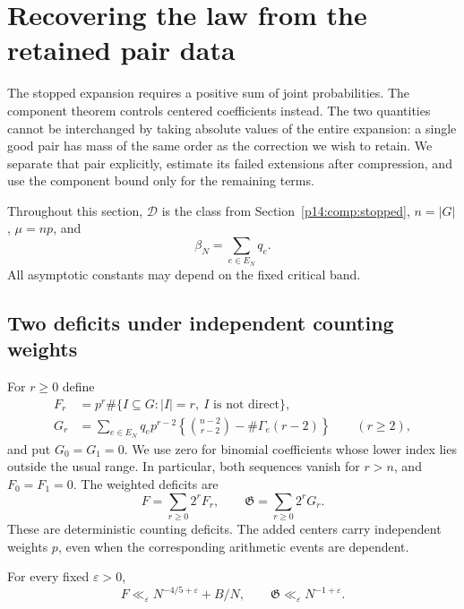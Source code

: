\section{Recovering the law from the retained pair data}
\label{p1:close:section}

The stopped expansion requires a positive sum of joint
probabilities.  The component theorem controls centered
coefficients instead.  The two quantities cannot be interchanged
by taking absolute values of the entire expansion: a single good
pair has mass of the same order as the correction we wish to
retain.  We separate that pair explicitly, estimate its failed
extensions after compression, and use the component bound only
for the remaining terms.

Throughout this section, $\mathscr D$ is the class from
Section~\ref{p14:comp:stopped}, $n=|G|$, $\mu=np$, and
\[
 \beta_N=\sum_{e\in E_N}q_e.
\]
All asymptotic constants may depend on the fixed critical band.

\subsection{Two deficits under independent counting weights}

For $r\ge0$ define
\begin{align}
 F_r&=p^r\#\{I\subseteq G:|I|=r,\ I\text{ is not direct}\},
       \label{p1:close:deficit-F}\\
 G_r&=\sum_{e\in E_N}q_ep^{r-2}
      \left\{\binom{n-2}{r-2}-\#\Gamma_e(r-2)\right\}
                   \qquad(r\ge2),
       \label{p1:close:deficit-G}
\end{align}
and put $G_0=G_1=0$.  We use zero for binomial coefficients
whose lower index lies outside the usual range.  In particular,
both sequences vanish for $r>n$, and $F_0=F_1=0$.
The weighted deficits are
\begin{equation}
 F=\sum_{r\ge0}2^rF_r,\qquad
 \mathfrak G=\sum_{r\ge0}2^rG_r.
 \label{p1:close:total-deficits}
\end{equation}
These are deterministic counting deficits.  The added centers
carry independent weights $p$, even when the corresponding
arithmetic events are dependent.

\begin{lemma}
\label{p1:close:deficit-bounds}
For every fixed $\varepsilon>0$,
\begin{equation}
 F\ll_\varepsilon N^{-4/5+\varepsilon}+B/N,
 \qquad
 \mathfrak G\ll_\varepsilon N^{-1+\varepsilon}.
 \label{p1:close:deficit-rates}
\end{equation}
\end{lemma}

